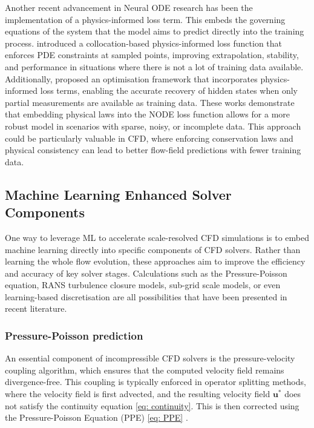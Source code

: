 Another recent advancement in Neural ODE research has been the implementation of a physics-informed loss term. This embeds the governing equations of the system that the model aims to predict directly into the training process. \textcite{Sholokhov2023} introduced a collocation-based physics-informed loss function that enforces PDE constraints at sampled points, improving extrapolation, stability, and performance in situations where there is not a lot of training data available. Additionally, \textcite{Ghanem2025} proposed an optimisation framework that incorporates physics-informed loss terms, enabling the accurate recovery of hidden states when only partial measurements are available as training data. These works demonstrate that embedding physical laws into the NODE loss function allows for a more robust model in scenarios with sparse, noisy, or incomplete data. This approach could be particularly valuable in CFD, where enforcing conservation laws and physical consistency can lead to better flow-field predictions with fewer training data. 

 
\subsection{Machine Learning Enhanced Solver Components}
\label{subsection: ML solver}

One way to leverage ML to accelerate scale-resolved CFD simulations is to embed machine learning directly into specific components of CFD solvers. Rather than learning the whole flow evolution, these approaches aim to improve the efficiency and accuracy of key solver stages. Calculations such as the Pressure-Poisson equation, RANS turbulence closure models, sub-grid scale models, or even learning-based discretisation are all possibilities that have been presented in recent literature. 


\subsubsection{Pressure-Poisson prediction}
An essential component of incompressible CFD solvers is the pressure-velocity coupling algorithm, which ensures that the computed velocity field remains divergence-free. This coupling is typically enforced in operator splitting methods, where the velocity field is first advected, and the resulting velocity field $\mathbf{u^*}$ does not satisfy the continuity equation \ref{eq: continuity}. This is then corrected using the Pressure-Poisson Equation (PPE) \ref{eq: PPE} \cite{Vinuesa2022}.

